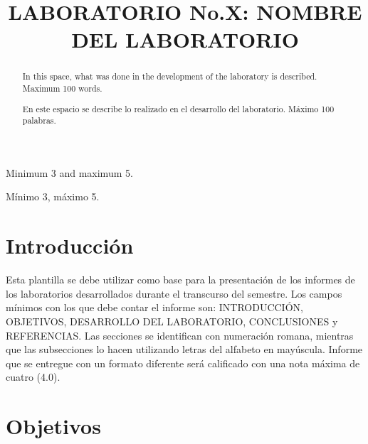 \documentclass[conference]{IEEEtran}
\begin{document}
\title{LABORATORIO No.X: NOMBRE DEL LABORATORIO
}

\author{
\and
{}
}

\maketitle

\begin{abstract}
In this space, what was done in the development of the laboratory is described. Maximum 100 words.\\
\end{abstract}
\renewcommand\IEEEkeywordsname{Keywords}
\begin{IEEEkeywords}
Minimum 3 and maximum 5.\\
\end{IEEEkeywords}


\begin{abstract}
En este espacio se describe lo realizado en el desarrollo del laboratorio. Máximo 100 palabras.\\
\end{abstract}

\renewcommand\IEEEkeywordsname{Palabras Clave}
\begin{IEEEkeywords}
Mínimo 3, máximo 5.
\end{IEEEkeywords}


\section{Introducción}
Esta plantilla se debe utilizar como base para la presentación de los informes de los laboratorios desarrollados durante el transcurso del semestre. Los campos mínimos con los que debe contar el informe son: INTRODUCCIÓN, OBJETIVOS, DESARROLLO DEL LABORATORIO, CONCLUSIONES y REFERENCIAS. Las secciones se identifican con numeración romana, mientras que las subsecciones lo hacen utilizando letras del alfabeto en mayúscula. Informe que se entregue con un formato diferente será calificado con una nota máxima de cuatro (4.0). 

\section{Objetivos}
\end{document}
